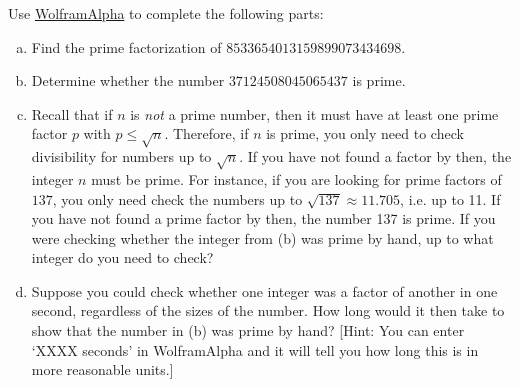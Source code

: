 \documentclass[11pt,letterpaper]{article}
\begin{document}
 Use \href{https://www.wolframalpha.com/}{WolframAlpha} to complete the following parts: 
\begin{enumerate}[(a)]
\item Find the prime factorization of $8533654013159899073434698$. \vfill
\item Determine whether the number $37124508045065437$ is prime. \vfill
\item Recall that if $n$ is \textit{not} a prime number, then it must have at least one prime factor $p$ with $p \leq \sqrt{n}$. Therefore, if $n$ is prime, you only need to check divisibility for numbers up to $\sqrt{n}$. If you have not found a factor by then, the integer $n$ must be prime. For instance, if you are looking for prime factors of $137$, you only need check the numbers up to $\sqrt{137} \approx 11.705$, i.e. up to 11. If you have not found a prime factor by then, the number 137 is prime. If you were checking whether the integer from (b) was prime by hand, up to what integer do you need to check? \vfill
\item  Suppose you could check whether one integer was a factor of another in one second, regardless of the sizes of the number. How long would it then take to show that the number in (b) was prime by hand? [Hint: You can enter `XXXX seconds' in WolframAlpha and it will tell you how long this is in more reasonable units.]
\end{enumerate} \vfill



\end{document}
